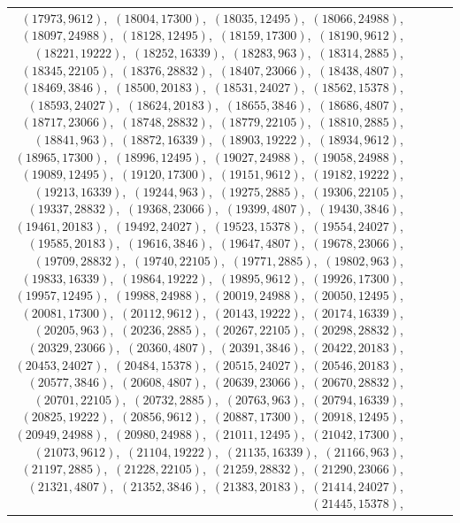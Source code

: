 \documentclass[11pt]{article}
\begin{document}
\begin{longtable}{@{}rrl>{\raggedright\arraybackslash}p{}@{}}
$(17973,9612)$,\allowbreak\ $(18004,17300)$,\allowbreak\ $(18035,12495)$,\allowbreak\ $(18066,24988)$,\allowbreak\ $(18097,24988)$,\allowbreak\ $(18128,12495)$,\allowbreak\ $(18159,17300)$,\allowbreak\ $(18190,9612)$,\allowbreak\ $(18221,19222)$,\allowbreak\ $(18252,16339)$,\allowbreak\ $(18283,963)$,\allowbreak\ $(18314,2885)$,\allowbreak\ $(18345,22105)$,\allowbreak\ $(18376,28832)$,\allowbreak\ $(18407,23066)$,\allowbreak\ $(18438,4807)$,\allowbreak\ $(18469,3846)$,\allowbreak\ $(18500,20183)$,\allowbreak\ $(18531,24027)$,\allowbreak\ $(18562,15378)$,\allowbreak\ $(18593,24027)$,\allowbreak\ $(18624,20183)$,\allowbreak\ $(18655,3846)$,\allowbreak\ $(18686,4807)$,\allowbreak\ $(18717,23066)$,\allowbreak\ $(18748,28832)$,\allowbreak\ $(18779,22105)$,\allowbreak\ $(18810,2885)$,\allowbreak\ $(18841,963)$,\allowbreak\ $(18872,16339)$,\allowbreak\ $(18903,19222)$,\allowbreak\ $(18934,9612)$,\allowbreak\ $(18965,17300)$,\allowbreak\ $(18996,12495)$,\allowbreak\ $(19027,24988)$,\allowbreak\ $(19058,24988)$,\allowbreak\ $(19089,12495)$,\allowbreak\ $(19120,17300)$,\allowbreak\ $(19151,9612)$,\allowbreak\ $(19182,19222)$,\allowbreak\ $(19213,16339)$,\allowbreak\ $(19244,963)$,\allowbreak\ $(19275,2885)$,\allowbreak\ $(19306,22105)$,\allowbreak\ $(19337,28832)$,\allowbreak\ $(19368,23066)$,\allowbreak\ $(19399,4807)$,\allowbreak\ $(19430,3846)$,\allowbreak\ $(19461,20183)$,\allowbreak\ $(19492,24027)$,\allowbreak\ $(19523,15378)$,\allowbreak\ $(19554,24027)$,\allowbreak\ $(19585,20183)$,\allowbreak\ $(19616,3846)$,\allowbreak\ $(19647,4807)$,\allowbreak\ $(19678,23066)$,\allowbreak\ $(19709,28832)$,\allowbreak\ $(19740,22105)$,\allowbreak\ $(19771,2885)$,\allowbreak\ $(19802,963)$,\allowbreak\ $(19833,16339)$,\allowbreak\ $(19864,19222)$,\allowbreak\ $(19895,9612)$,\allowbreak\ $(19926,17300)$,\allowbreak\ $(19957,12495)$,\allowbreak\ $(19988,24988)$,\allowbreak\ $(20019,24988)$,\allowbreak\ $(20050,12495)$,\allowbreak\ $(20081,17300)$,\allowbreak\ $(20112,9612)$,\allowbreak\ $(20143,19222)$,\allowbreak\ $(20174,16339)$,\allowbreak\ $(20205,963)$,\allowbreak\ $(20236,2885)$,\allowbreak\ $(20267,22105)$,\allowbreak\ $(20298,28832)$,\allowbreak\ $(20329,23066)$,\allowbreak\ $(20360,4807)$,\allowbreak\ $(20391,3846)$,\allowbreak\ $(20422,20183)$,\allowbreak\ $(20453,24027)$,\allowbreak\ $(20484,15378)$,\allowbreak\ $(20515,24027)$,\allowbreak\ $(20546,20183)$,\allowbreak\ $(20577,3846)$,\allowbreak\ $(20608,4807)$,\allowbreak\ $(20639,23066)$,\allowbreak\ $(20670,28832)$,\allowbreak\ $(20701,22105)$,\allowbreak\ $(20732,2885)$,\allowbreak\ $(20763,963)$,\allowbreak\ $(20794,16339)$,\allowbreak\ $(20825,19222)$,\allowbreak\ $(20856,9612)$,\allowbreak\ $(20887,17300)$,\allowbreak\ $(20918,12495)$,\allowbreak\ $(20949,24988)$,\allowbreak\ $(20980,24988)$,\allowbreak\ $(21011,12495)$,\allowbreak\ $(21042,17300)$,\allowbreak\ $(21073,9612)$,\allowbreak\ $(21104,19222)$,\allowbreak\ $(21135,16339)$,\allowbreak\ $(21166,963)$,\allowbreak\ $(21197,2885)$,\allowbreak\ $(21228,22105)$,\allowbreak\ $(21259,28832)$,\allowbreak\ $(21290,23066)$,\allowbreak\ $(21321,4807)$,\allowbreak\ $(21352,3846)$,\allowbreak\ $(21383,20183)$,\allowbreak\ $(21414,24027)$,\allowbreak\ $(21445,15378)$,\allowbreak\ 
\end{longtable}
\end{document}

